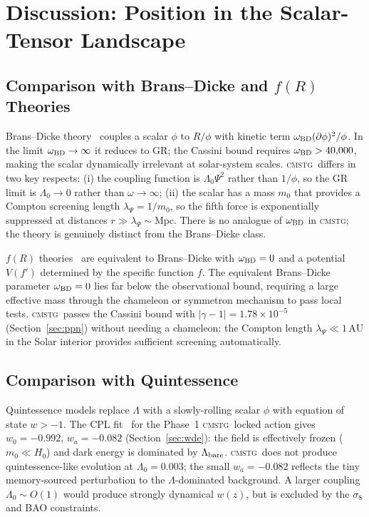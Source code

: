 \documentclass[12pt,a4paper]{article}
\newcommand{\CMSTG}{\textsc{cmstg}}
\newcommand{\Lz}{\Lambda_0}
\begin{document}
\section{Discussion: Position in the Scalar-Tensor Landscape}
\label{sec:discussion}

\subsection{Comparison with Brans--Dicke and \texorpdfstring{$f(R)$}{f(R)} Theories}

Brans--Dicke theory~\cite{BransDicke1961} couples a scalar $\phi$ to $R/\phi$
with kinetic term $\omega_{\rm BD}(\partial\phi)^2/\phi$. In the limit
$\omega_{\rm BD} \to \infty$ it reduces to GR; the Cassini bound requires
$\omega_{\rm BD} > 40{,}000$, making the scalar dynamically irrelevant at
solar-system scales. \CMSTG\ differs in two key respects: (i) the coupling
function is $\Lz\Psi^2$ rather than $1/\phi$, so the GR limit is $\Lz \to 0$
rather than $\omega \to \infty$; (ii) the scalar has a mass $m_0$ that
provides a Compton screening length $\lambda_\Psi = 1/m_0$, so the fifth
force is exponentially suppressed at distances $r \gg \lambda_\Psi \sim
\mathrm{Mpc}$. There is no analogue of $\omega_{\rm BD}$ in \CMSTG; the
theory is genuinely distinct from the Brans--Dicke class.

$f(R)$ theories~\cite{Sotiriou2010} are equivalent to Brans--Dicke with
$\omega_{\rm BD} = 0$ and a potential $V(f')$ determined by the specific
function $f$. The equivalent Brans--Dicke parameter $\omega_{\rm BD} = 0$
lies far below the observational bound, requiring a large effective mass
through the chameleon or symmetron mechanism to pass local tests. \CMSTG\
passes the Cassini bound with $|\gamma - 1| = 1.78\times10^{-5}$ (Section~\ref{sec:ppn})
without needing a chameleon: the Compton length $\lambda_\Psi \ll 1\,\mathrm{AU}$
in the Solar interior provides sufficient screening automatically.

\subsection{Comparison with Quintessence}

Quintessence models replace $\Lambda$ with a slowly-rolling scalar $\phi$
with equation of state $w > -1$. The CPL fit~\cite{Chevallier2001,Linder2003}
for the Phase~1 \CMSTG\ locked action gives $w_0 = -0.992$, $w_a = -0.082$
(Section~\ref{sec:wde}): the field is effectively frozen ($m_0 \ll H_0$)
and dark energy is dominated by $\Lambda_{\rm bare}$. \CMSTG\ does not
produce quintessence-like evolution at $\Lz = 0.003$; the small $w_a = -0.082$
reflects the tiny memory-sourced perturbation to the $\Lambda$-dominated
background. A larger coupling $\Lz \sim O(1)$ would produce strongly dynamical
$w(z)$, but is excluded by the $\sigma_8$ and BAO constraints.
\end{document}
